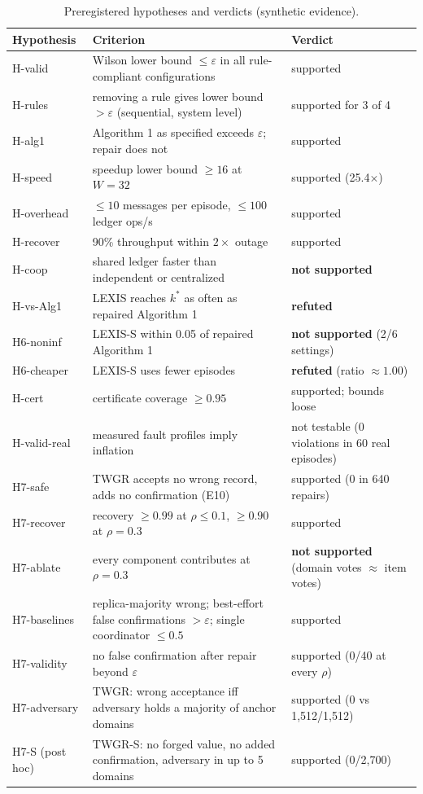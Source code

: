 \documentclass[11pt]{article}
\theoremstyle{definition}
\begin{document}
\begin{table}[!htbp]\centering\small
\caption{Preregistered hypotheses and verdicts (synthetic evidence).}\label{tab:verdicts}
\begin{tabularx}{\linewidth}{lX>{\raggedright\arraybackslash}p{4.0cm}}
\toprule
Hypothesis & Criterion & Verdict \\\midrule
H-valid & Wilson lower bound $\le\varepsilon$ in all rule-compliant configurations & supported \\
H-rules & removing a rule gives lower bound $>\varepsilon$ (sequential, system level) & supported for 3 of 4 \\
H-alg1 & Algorithm 1 as specified exceeds $\varepsilon$; repair does not & supported \\
H-speed & speedup lower bound $\ge16$ at $W=32$ & supported (25.4$\times$) \\
H-overhead & $\le10$ messages per episode, $\le100$ ledger ops/s & supported \\
H-recover & 90\% throughput within $2\times$ outage & supported \\
H-coop & shared ledger faster than independent or centralized & \textbf{not supported} \\
H-vs-Alg1 & LEXIS reaches $k^*$ as often as repaired Algorithm 1 & \textbf{refuted} \\
H6-noninf & LEXIS-S within 0.05 of repaired Algorithm 1 & \textbf{not supported} (2/6 settings) \\
H6-cheaper & LEXIS-S uses fewer episodes & \textbf{refuted} (ratio $\approx1.00$) \\
H-cert & certificate coverage $\ge0.95$ & supported; bounds loose \\
H-valid-real & measured fault profiles imply inflation & not testable (0 violations in 60 real episodes) \\
H7-safe & TWGR accepts no wrong record, adds no confirmation (E10) & supported (0 in 640 repairs) \\
H7-recover & recovery $\ge0.99$ at $\rho\le0.1$, $\ge0.90$ at $\rho=0.3$ & supported \\
H7-ablate & every component contributes at $\rho=0.3$ & \textbf{not supported} (domain votes $\approx$ item votes) \\
H7-baselines & replica-majority wrong; best-effort false confirmations $>\varepsilon$; single coordinator $\le0.5$ & supported \\
H7-validity & no false confirmation after repair beyond $\varepsilon$ & supported (0/40 at every $\rho$) \\
H7-adversary & TWGR: wrong acceptance iff adversary holds a majority of anchor domains & supported (0 vs 1{,}512/1{,}512) \\
H7-S (post hoc) & TWGR-S: no forged value, no added confirmation, adversary in up to 5 domains & supported (0/2{,}700) \\
\bottomrule\end{tabularx}
\end{table}
\end{document}
